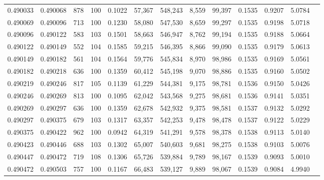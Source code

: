 \begin{tabular}{rrrrrrrrrrrrr}
0.490033 & 0.490068 &   878 & 100 &                                     0.1022 &  57,367 & 548,243 &   8,559 &  99,397 & 0.1535 & 0.9207 & 5.0784 \\
0.490069 & 0.490096 &   713 & 100 &                                     0.1230 &  58,080 & 547,530 &   8,659 &  99,297 & 0.1535 & 0.9198 & 5.0718 \\
0.490096 & 0.490122 &   583 & 103 &                                     0.1501 &  58,663 & 546,947 &   8,762 &  99,194 & 0.1535 & 0.9188 & 5.0664 \\
0.490122 & 0.490149 &   552 & 104 &                                     0.1585 &  59,215 & 546,395 &   8,866 &  99,090 & 0.1535 & 0.9179 & 5.0613 \\
0.490149 & 0.490182 &   561 & 104 &                                     0.1564 &  59,776 & 545,834 &   8,970 &  98,986 & 0.1535 & 0.9169 & 5.0561 \\
0.490182 & 0.490218 &   636 & 100 &                                     0.1359 &  60,412 & 545,198 &   9,070 &  98,886 & 0.1535 & 0.9160 & 5.0502 \\
0.490219 & 0.490246 &   817 & 105 &                                     0.1139 &  61,229 & 544,381 &   9,175 &  98,781 & 0.1536 & 0.9150 & 5.0426 \\
0.490246 & 0.490269 &   813 & 100 &                                     0.1095 &  62,042 & 543,568 &   9,275 &  98,681 & 0.1536 & 0.9141 & 5.0351 \\
0.490269 & 0.490297 &   636 & 100 &                                     0.1359 &  62,678 & 542,932 &   9,375 &  98,581 & 0.1537 & 0.9132 & 5.0292 \\
0.490297 & 0.490375 &   679 & 103 &                                     0.1317 &  63,357 & 542,253 &   9,478 &  98,478 & 0.1537 & 0.9122 & 5.0229 \\
0.490375 & 0.490422 &   962 & 100 &                                     0.0942 &  64,319 & 541,291 &   9,578 &  98,378 & 0.1538 & 0.9113 & 5.0140 \\
0.490423 & 0.490446 &   688 & 103 &                                     0.1302 &  65,007 & 540,603 &   9,681 &  98,275 & 0.1538 & 0.9103 & 5.0076 \\
0.490447 & 0.490472 &   719 & 108 &                                     0.1306 &  65,726 & 539,884 &   9,789 &  98,167 & 0.1539 & 0.9093 & 5.0010 \\
0.490472 & 0.490503 &   757 & 100 &                                     0.1167 &  66,483 & 539,127 &   9,889 &  98,067 & 0.1539 & 0.9084 & 4.9940 \\

\end{tabular}
